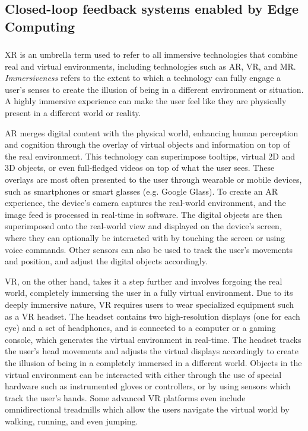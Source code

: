 \subsection{Closed-loop feedback systems enabled by Edge Computing}



\subsubsection{}\label{background:xr}

\gls{XR} is an umbrella term used to refer to all immersive technologies that combine real and virtual environments, including technologies such as \gls{AR}, \gls{VR}, and \gls{MR}.
\emph{Immersiveness} refers to the extent to which a technology can fully engage a user's senses to create the illusion of being in a different environment or situation.
A highly immersive experience can make the user feel like they are physically present in a different world or reality.

\gls{AR} merges digital content with the physical world, enhancing human perception and cognition through the overlay of virtual objects and information on top of the real environment.
This technology can superimpose tooltips, virtual \gls{2D} and \gls{3D} objects, or even full-fledged videos on top of what the user sees.
These overlays are most often presented to the user through wearable or mobile devices, such as smartphones or smart glasses (e.g. Google Glass).
To create an \gls{AR} experience, the device's camera captures the real-world environment, and the image feed is processed in real-time in software.
The digital objects are then superimposed onto the real-world view and displayed on the device's screen, where they can optionally be interacted with by touching the screen or using voice commands.
Other sensors can also be used to track the user's movements and position, and adjust the digital objects accordingly.

\gls{VR}, on the other hand, takes it a step further and involves forgoing the real world, completely immersing the user in a fully virtual environment.
Due to its deeply immersive nature, \gls{VR} requires users to wear specialized equipment such as a \gls{VR} headset.
The headset contains two high-resolution displays (one for each eye) and a set of headphones, and is connected to a computer or a gaming console, which generates the virtual environment in real-time.
The headset tracks the user's head movements and adjusts the virtual displays accordingly to create the illusion of being in a completely immersed in a different world.
Objects in the virtual environment can be interacted with either through the use of special hardware such as instrumented gloves or controllers, or by using sensors which track the user's hands.
Some advanced \gls{VR} platforms even include omnidirectional treadmills which allow the users navigate the virtual world by walking, running, and even jumping. 

